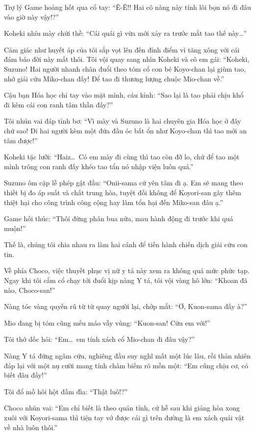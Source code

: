 \documentclass[../main.tex]{subfiles}
\begin{document}
Trợ lý Game hoảng hốt qua cổ tay: ``Ê-Ê!! Hai cô nàng này tính lôi bọn nó đi đâu vào giờ này vậy!?''

Koheki nhíu mày chửi thề: ``Cái quái gì vừa mới xảy ra trước mắt tao thế này\dots''

Cảm giác như huyết áp của tôi sắp vọt lên đến đỉnh điểm vì tăng xông với cái đám báo đời này mất thôi. Tôi vội quay sang nhìn Koheki và cô em gái: ``Koheki, Suzuno! Hai người nhanh chân đuổi theo tóm cổ con bé Koyo-chan lại giùm tao, nhớ giải cứu Miko-chan đấy! Để tao đi thương lượng chuộc Mio-chan về.''

Cậu bạn Hóa học chỉ tay vào mặt mình, cáu kỉnh: ``Sao lại là tao phải chịu khổ đi kèm cái con ranh tâm thần đấy?''

Tôi nhún vai đáp tỉnh bơ: ``Vì mày và Suzuno là hai chuyên gia Hóa học ở đây chứ sao! Đi hai người kèm một đứa đầu óc bất ổn như Koyo-chan thì tao mới an tâm được!''

Koheki tặc lưỡi: ``Haiz\dots\ Có em mày đi cùng thì tao còn đỡ lo, chứ để tao một mình trông con ranh đấy khéo tao tẩn nó nhập viện luôn quá.''

Suzuno ôm cặp lễ phép gật đầu: ``Onii-sama cứ yên tâm đi ạ. Em sẽ mang theo thiết bị đo áp suất và chất trung hòa, tuyệt đối không để Koyori-san gây thêm thiệt hại cho công trình công cộng hay làm tổn hại đến Miko-san đâu ạ.''

Game hối thúc: ``Thôi đừng phân bua nữa, mau hành động đi trước khi quá muộn!''

Thế là, chúng tôi chia nhau ra làm hai cánh để tiến hành chiến dịch giải cứu con tin.

Về phía Choco, việc thuyết phục vị nữ y tá này xem ra không quá mức phức tạp. Ngay khi tôi cắm cổ chạy tới đuổi kịp nàng Y tá, tôi vội vàng hô lớn: ``Khoan đã nào, Choco-san!''

Nàng tóc vàng quyến rũ từ từ quay người lại, chớp mắt: ``Ơ, Kuon-sama đấy à?''

Mio đang bị tóm cũng mếu máo vẫy vùng: ``Kuon-san! Cứu em với!''

Tôi thở dốc hỏi: ``Em\dots\ em tính xách cổ Mio-chan đi đâu vậy?''

Nàng Y tá đứng ngâm cứu, nghiêng đầu suy nghĩ mất một lúc lâu, rồi thản nhiên đáp lại với một nụ cười mang tính châm biếm rõ mồn một: ``Em cũng chịu cơ, có biết đâu đấy!''

Tôi đổ mồ hôi hột đầm đìa: ``Thật luô!?''

Choco nhún vai: ``Em chỉ biết là theo quán tính, cứ hễ sau khi giảng hòa xong xuôi với Koyori-sama thì tiện tay vớ được cái gì trên đường là em xách quái vật về nhà luôn thôi.''
\end{document}
